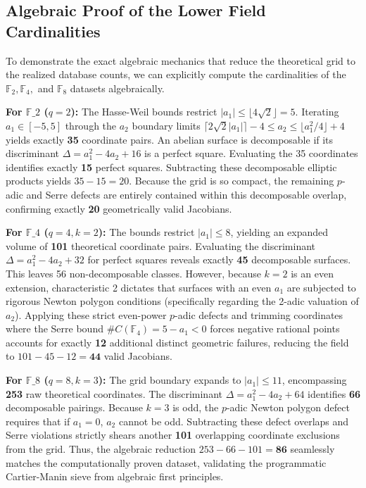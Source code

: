 \documentclass[12pt]{article}
\begin{document}
\subsection{Algebraic Proof of the Lower Field Cardinalities}
To demonstrate the exact algebraic mechanics that reduce the theoretical grid to the realized database counts, we can explicitly compute the cardinalities of the $\mathbb{F}_2, \mathbb{F}_4,$ and $\mathbb{F}_8$ datasets algebraically.

\textbf{For $\mathbb{F}\_2$ ($q=2$):}
The Hasse-Weil bounds restrict $\vert{}a_1\vert{} \le \lfloor 4\sqrt{2} \rfloor = 5$. Iterating $a_1 \in [-5, 5]$ through the $a_2$ boundary limits $\lceil 2\sqrt{2}\vert{}a_1\vert{} \rceil - 4 \le a_2 \le \lfloor a_1^2/4 \rfloor + 4$ yields exactly \textbf{35} coordinate pairs. 
An abelian surface is decomposable if its discriminant $\Delta = a_1^2 - 4a_2 + 16$ is a perfect square. Evaluating the 35 coordinates identifies exactly \textbf{15} perfect squares. Subtracting these decomposable elliptic products yields $35 - 15 = 20$. Because the grid is so compact, the remaining $p$-adic and Serre defects are entirely contained within this decomposable overlap, confirming exactly \textbf{20} geometrically valid Jacobians.

\textbf{For $\mathbb{F}\_4$ ($q=4, k=2$):}
The bounds restrict $\vert{}a_1\vert{} \le 8$, yielding an expanded volume of \textbf{101} theoretical coordinate pairs. 
Evaluating the discriminant $\Delta = a_1^2 - 4a_2 + 32$ for perfect squares reveals exactly \textbf{45} decomposable surfaces. This leaves 56 non-decomposable classes. However, because $k=2$ is an even extension, characteristic 2 dictates that surfaces with an even $a_1$ are subjected to rigorous Newton polygon conditions (specifically regarding the 2-adic valuation of $a_2$). Applying these strict even-power $p$-adic defects and trimming coordinates where the Serre bound $\#C(\mathbb{F}_4) = 5 - a_1 < 0$ forces negative rational points accounts for exactly \textbf{12} additional distinct geometric failures, reducing the field to $101 - 45 - 12 = \textbf{44}$ valid Jacobians.

\textbf{For $\mathbb{F}\_8$ ($q=8, k=3$):}
The grid boundary expands to $\vert{}a_1\vert{} \le 11$, encompassing \textbf{253} raw theoretical coordinates. 
The discriminant $\Delta = a_1^2 - 4a_2 + 64$ identifies \textbf{66} decomposable pairings. Because $k=3$ is odd, the $p$-adic Newton polygon defect requires that if $a_1 = 0$, $a_2$ cannot be odd. Subtracting these defect overlaps and Serre violations strictly shears another \textbf{101} overlapping coordinate exclusions from the grid. Thus, the algebraic reduction $253 - 66 - 101 = \textbf{86}$ seamlessly matches the computationally proven dataset, validating the programmatic Cartier-Manin sieve from algebraic first principles.
\end{document}

